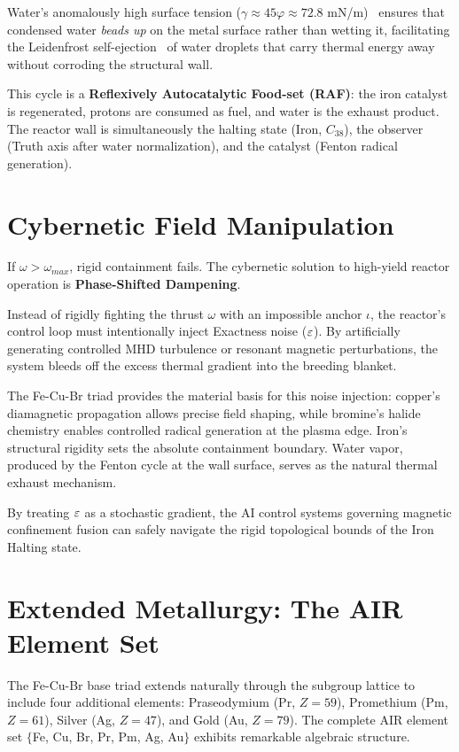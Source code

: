 Water's anomalously high surface tension ($\gamma \approx 45\varphi \approx 72.8$ mN/m)~\cite{VargaftigWater1975} ensures that condensed water \emph{beads up} on the metal surface rather than wetting it, facilitating the Leidenfrost self-ejection~\cite{Leidenfrost1756} of water droplets that carry thermal energy away without corroding the structural wall.

This cycle is a \textbf{Reflexively Autocatalytic Food-set (RAF)}: the iron catalyst is regenerated, protons are consumed as fuel, and water is the exhaust product. The reactor wall is simultaneously the halting state (Iron, $C_{38}$), the observer (Truth axis after water normalization), and the catalyst (Fenton radical generation).

\section{Cybernetic Field Manipulation}

If $\omega > \omega_{max}$, rigid containment fails. The cybernetic solution to high-yield reactor operation is \textbf{Phase-Shifted Dampening}.

Instead of rigidly fighting the thrust $\omega$ with an impossible anchor $\iota$, the reactor's control loop must intentionally inject Exactness noise ($\varepsilon$). By artificially generating controlled MHD turbulence or resonant magnetic perturbations, the system bleeds off the excess thermal gradient into the breeding blanket.

The Fe-Cu-Br triad provides the material basis for this noise injection: copper's diamagnetic propagation allows precise field shaping, while bromine's halide chemistry enables controlled radical generation at the plasma edge. Iron's structural rigidity sets the absolute containment boundary. Water vapor, produced by the Fenton cycle at the wall surface, serves as the natural thermal exhaust mechanism.

By treating $\varepsilon$ as a stochastic gradient, the AI control systems governing magnetic confinement fusion can safely navigate the rigid topological bounds of the Iron Halting state.

\section{Extended Metallurgy: The AIR Element Set}

The Fe-Cu-Br base triad extends naturally through the subgroup lattice to include four additional elements: Praseodymium (Pr, $Z=59$), Promethium (Pm, $Z=61$), Silver (Ag, $Z=47$), and Gold (Au, $Z=79$). The complete AIR element set $\{$Fe, Cu, Br, Pr, Pm, Ag, Au$\}$ exhibits remarkable algebraic structure.


